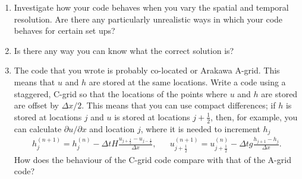 \begin{enumerate}
\item Investigate how your code behaves when you vary the spatial and temporal
resolution. Are there any particularly unrealistic ways in which your
code behaves for certain set ups?
\item Is there any way you can know what the correct solution is?
\item The code that you wrote is probably co-located or Arakawa A-grid.
This means that $u$ and $h$ are stored at the same locations. Write
a code using a staggered, C-grid so that the locations of the points
where $u$ and $h$ are stored are offset by $\Delta x/2$. This means
that you can use compact differences; if $h$ is stored at locations
$j$ and $u$ is stored at locations $j+\frac{1}{2}$, then, for example,
you can calculate $\partial u/\partial x$ and location $j$, where
it is needed to increment $h_{j}$
\begin{eqnarray*}
h_{j}^{(n+1)}=h_{j}^{(n)}-\Delta tH\frac{u_{j+\frac{1}{2}}-u_{j-\frac{1}{2}}}{\Delta x}, &  & u_{j+\frac{1}{2}}^{(n+1)}=u_{j+\frac{1}{2}}^{(n)}-\Delta tg\frac{h_{j+1}-h_{j}}{\Delta x}.
\end{eqnarray*}
How does the behaviour of the C-grid code compare with that of the
A-grid code?
\end{enumerate}

